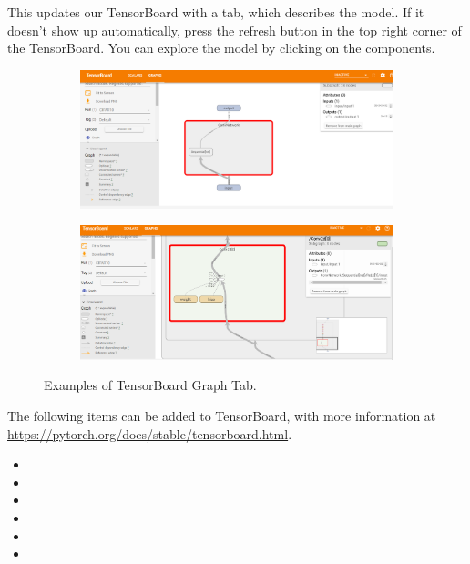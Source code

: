 This updates our TensorBoard with a  tab, which describes the model.
If it doesn't show up automatically, press the refresh button in the top right corner of the TensorBoard.
You can explore the model by clicking on the components.
\begin{figure}[H] %
    \centering
    \begin{subfigure}{.66\textwidth}
        \includegraphics[width=\textwidth]{figures/net1.png}
    \end{subfigure}
    \begin{subfigure}{.66\textwidth}
        \includegraphics[width=\textwidth]{figures/net2.png}
    \end{subfigure}

\caption{Examples of TensorBoard Graph Tab.}
\label{fig:graphs}
\end{figure}

The following items can be added to TensorBoard, with more information at \url{https://pytorch.org/docs/stable/tensorboard.html}.

\begin{itemize}
\item {}
\item {}
\item {}
\item {}
\item {}
\item {}

\end{itemize}

